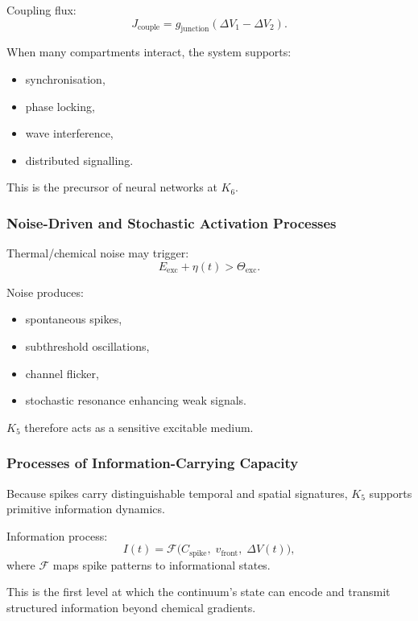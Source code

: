 Coupling flux:
\[
J_{\text{couple}} = g_{\text{junction}}(\Delta V_1 - \Delta V_2).
\]

When many compartments interact, the system supports:
\begin{itemize}
    \item synchronisation,
    \item phase locking,
    \item wave interference,
    \item distributed signalling.
\end{itemize}

This is the precursor of neural networks at $K_6$.

\subsubsection{Noise-Driven and Stochastic Activation Processes}

Thermal/chemical noise may trigger:
\[
E_{\text{exc}} + \eta(t) > \Theta_{\text{exc}}.
\]

Noise produces:
\begin{itemize}
    \item spontaneous spikes,
    \item subthreshold oscillations,
    \item channel flicker,
    \item stochastic resonance enhancing weak signals.
\end{itemize}

$K_5$ therefore acts as a sensitive excitable medium.

\subsubsection{Processes of Information-Carrying Capacity}

Because spikes carry distinguishable temporal and spatial signatures,
$K_5$ supports primitive information dynamics.

Information process:
\[
I(t) = \mathcal{F}\big(C_{\text{spike}},\; v_{\text{front}},\; \Delta V(t)\big),
\]
where $\mathcal{F}$ maps spike patterns to informational states.

This is the first level at which the continuum’s state can encode
and transmit structured information beyond chemical gradients.

